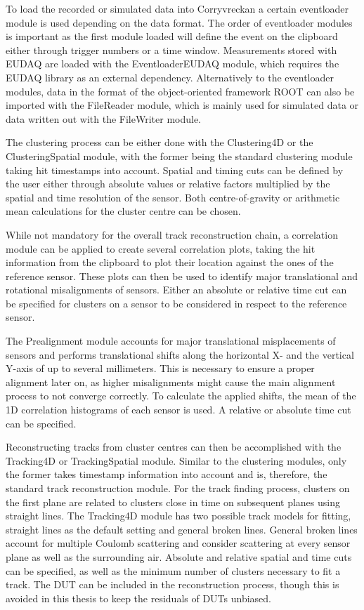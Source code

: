 To load the recorded or simulated data into Corryvreckan a certain eventloader module is used depending on the data format. The order of eventloader modules
is important as the first module loaded will define the event on the clipboard either through trigger numbers or a time window. Measurements stored with EUDAQ are loaded with the
EventloaderEUDAQ module, which requires the EUDAQ library as an external dependency. Alternatively to the eventloader modules, data in the format of the
object-oriented framework ROOT \cite{root} can also be imported
with the FileReader module, which is mainly used for simulated data or data written out with the FileWriter module.

The clustering process can be either done with the Clustering4D or the ClusteringSpatial module, with the former being the standard clustering module taking hit timestamps
into account. Spatial and timing cuts can be defined by the user either through absolute values or relative factors multiplied by the spatial and time resolution of the sensor. Both
centre-of-gravity or arithmetic mean calculations for the cluster centre can be chosen.


While not mandatory for the overall track reconstruction chain, a correlation module can be applied to create several correlation plots, taking the hit information
from the clipboard to plot their location against the ones of the reference sensor. These plots can then be used to identify major translational and
rotational misalignments of sensors.  Either an absolute or relative time cut can be specified for clusters on a sensor to be considered in respect to
the reference sensor.

The Prealignment module accounts for major translational misplacements of sensors and performs translational shifts along the horizontal X- and the
vertical Y-axis of up to several millimeters. This is necessary to ensure a proper alignment later on, as higher misalignments might cause the main alignment process to not converge correctly.
To calculate the applied shifts, the mean of the 1D correlation
histograms of each sensor is used. A relative or absolute time cut can be specified.

Reconstructing tracks from cluster centres can then be accomplished with the Tracking4D or TrackingSpatial module. Similar to the clustering modules, only the former
takes timestamp information into account and is, therefore, the standard track reconstruction module. For the track finding process, clusters on the first plane are
related to clusters close in time on subsequent planes using straight lines.
The Tracking4D module has two possible track models for fitting, straight lines as the default setting and general
broken lines. General broken lines account for multiple Coulomb scattering and consider scattering at every sensor plane as well as the surrounding air.
Absolute and relative spatial and time cuts can be specified, as well as the minimum number
of clusters necessary to fit a track. The DUT can be included in the reconstruction process, though this is avoided in this thesis to keep the residuals of DUTs unbiased.



